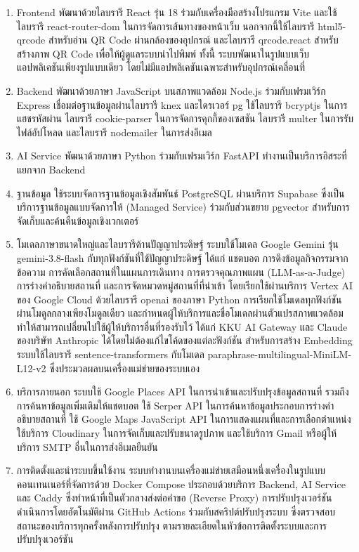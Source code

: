 \begin{enumerate}
\item Frontend พัฒนาด้วยไลบรารี React รุ่น 18 ร่วมกับเครื่องมือสร้างโปรแกรม Vite และใช้ไลบรารี react-router-dom ในการจัดการเส้นทางของหน้าเว็บ นอกจากนี้ใช้ไลบรารี html5-qrcode สำหรับอ่าน QR Code ผ่านกล้องของอุปกรณ์ และไลบรารี qrcode.react สำหรับสร้างภาพ QR Code เพื่อให้ผู้ดูแลระบบนำไปพิมพ์ ทั้งนี้ ระบบพัฒนาในรูปแบบเว็บแอปพลิเคชันเพียงรูปแบบเดียว โดยไม่มีแอปพลิเคชันเฉพาะสำหรับอุปกรณ์เคลื่อนที่
\item Backend พัฒนาด้วยภาษา JavaScript บนสภาพแวดล้อม Node.js ร่วมกับเฟรมเวิร์ก Express เชื่อมต่อฐานข้อมูลผ่านไลบรารี knex และไดรเวอร์ pg ใช้ไลบรารี bcryptjs ในการแฮชรหัสผ่าน ไลบรารี cookie-parser ในการจัดการคุกกี้ของเซสชัน ไลบรารี multer ในการรับไฟล์อัปโหลด และไลบรารี nodemailer ในการส่งอีเมล
\item AI Service พัฒนาด้วยภาษา Python ร่วมกับเฟรมเวิร์ก FastAPI ทำงานเป็นบริการอิสระที่แยกจาก Backend
\item ฐานข้อมูล ใช้ระบบจัดการฐานข้อมูลเชิงสัมพันธ์ PostgreSQL ผ่านบริการ Supabase ซึ่งเป็นบริการฐานข้อมูลแบบจัดการให้ (Managed Service) ร่วมกับส่วนขยาย pgvector สำหรับการจัดเก็บและค้นคืนข้อมูลเชิงเวกเตอร์
\item โมเดลภาษาขนาดใหญ่และไลบรารีด้านปัญญาประดิษฐ์ ระบบใช้โมเดล Google Gemini รุ่น gemini-3.8-flash กับทุกฟังก์ชันที่ใช้ปัญญาประดิษฐ์ ได้แก่ แชตบอต การดึงข้อมูลกิจกรรมจากข้อความ การคัดเลือกสถานที่ในแผนการเดินทาง การตรวจคุณภาพแผน (LLM-as-a-Judge) การร่างคำอธิบายสถานที่ และการจัดหมวดหมู่สถานที่ที่นำเข้า โดยเรียกใช้ผ่านบริการ Vertex AI ของ Google Cloud ด้วยไลบรารี openai ของภาษา Python การเรียกใช้โมเดลทุกฟังก์ชันผ่านโมดูลกลางเพียงโมดูลเดียว และกำหนดผู้ให้บริการและชื่อโมเดลผ่านตัวแปรสภาพแวดล้อม ทำให้สามารถเปลี่ยนไปใช้ผู้ให้บริการอื่นที่รองรับไว้ ได้แก่ KKU AI Gateway และ Claude ของบริษัท Anthropic ได้โดยไม่ต้องแก้ไขโค้ดของแต่ละฟังก์ชัน สำหรับการสร้าง Embedding ระบบใช้ไลบรารี sentence-transformers กับโมเดล paraphrase-multilingual-MiniLM-L12-v2 ซึ่งประมวลผลบนเครื่องแม่ข่ายของระบบเอง
\item บริการภายนอก ระบบใช้ Google Places API ในการนำเข้าและปรับปรุงข้อมูลสถานที่ รวมถึงการค้นหาข้อมูลเพิ่มเติมให้แชตบอต ใช้ Serper API ในการค้นหาข้อมูลประกอบการร่างคำอธิบายสถานที่ ใช้ Google Maps JavaScript API ในการแสดงแผนที่และการเลือกตำแหน่ง ใช้บริการ Cloudinary ในการจัดเก็บและปรับขนาดรูปภาพ และใช้บริการ Gmail หรือผู้ให้บริการ SMTP อื่นในการส่งอีเมลยืนยัน
\item การติดตั้งและนำระบบขึ้นใช้งาน ระบบทำงานบนเครื่องแม่ข่ายเสมือนหนึ่งเครื่องในรูปแบบคอนเทนเนอร์ที่จัดการด้วย Docker Compose ประกอบด้วยบริการ Backend, AI Service และ Caddy ซึ่งทำหน้าที่เป็นตัวกลางส่งต่อคำขอ (Reverse Proxy) การปรับปรุงเวอร์ชันดำเนินการโดยอัตโนมัติผ่าน GitHub Actions ร่วมกับสคริปต์ปรับปรุงระบบ ซึ่งตรวจสอบสถานะของบริการทุกครั้งหลังการปรับปรุง ตามรายละเอียดในหัวข้อการติดตั้งระบบและการปรับปรุงเวอร์ชัน
\end{enumerate}

